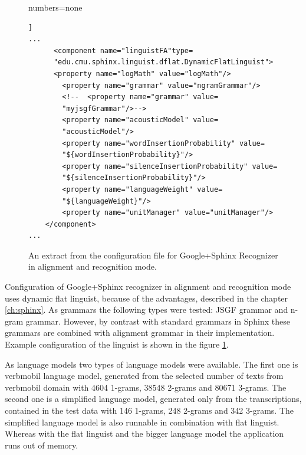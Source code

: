 \begin{figure}[htbp]
  \centering 
 
{numbers=none}  
\lstset{language=XML}  
\begin{lstlisting}[frame=single]]
...
      <component name="linguistFA"type=
      "edu.cmu.sphinx.linguist.dflat.DynamicFlatLinguist"> 
      <property name="logMath" value="logMath"/>
        <property name="grammar" value="ngramGrammar"/> 
        <!--  <property name="grammar" value=
        "myjsgfGrammar"/>--> 
        <property name="acousticModel" value=
        "acousticModel"/>
        <property name="wordInsertionProbability" value=
        "${wordInsertionProbability}"/>
        <property name="silenceInsertionProbability" value=
        "${silenceInsertionProbability}"/>
        <property name="languageWeight" value=
        "${languageWeight}"/>
        <property name="unitManager" value="unitManager"/>
    </component>
...
\end{lstlisting} 
 \caption{An extract from the configuration file for Google+Sphinx Recognizer in
 alignment and recognition mode.}
  \label{fig:conf_al_rec}
\end {figure}


Configuration of Google+Sphinx recognizer in alignment and recognition mode
uses dynamic flat linguist, because of the  advantages, described in the chapter
\ref{ch:sphinx}. As grammars the following types were tested: JSGF grammar
and n-gram grammar.  However, by contrast with
standard grammars in Sphinx these grammars are combined with alignment grammar 
in their implementation. Example configuration of the linguist is shown in the
figure  \ref{fig:conf_al_rec}.


As language models two types of language models were
available. The first one is  verbmobil language model, generated from the
selected number of texts from verbmobil domain with  4604 1-grams,  38548
2-grams and 80671 3-grams. The second one is a simplified language model, generated
only from the transcriptions, contained in the test data with 146 1-grams,
248 2-grams and 342 3-grams. The simplified language model is also runnable in
combination with flat linguist. Whereas  with the flat linguist and the bigger language model the 
application runs out of memory. 

